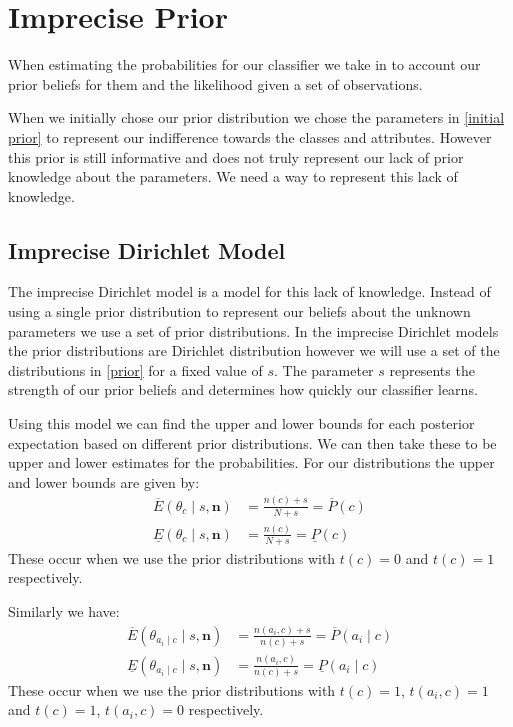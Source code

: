 \newcommand{\sn}[2]{\ensuremath{{#1}\times 10^{#2}}}

\chapter{Imprecise Prior}

When estimating the probabilities for our classifier we take in to account our prior beliefs for them and the likelihood given a set of observations.

When we initially chose our prior distribution we chose the parameters in \cref{initial prior} to represent our indifference towards the classes and attributes.
However this prior is still informative and does not truly represent our lack of prior knowledge about the parameters.
We need a way to represent this lack of knowledge.

\section{Imprecise Dirichlet Model}

The imprecise Dirichlet model is a model for this lack of knowledge.
Instead of using a single prior distribution to represent our beliefs about the unknown parameters we use a set of prior distributions.
In the imprecise Dirichlet models the prior distributions are Dirichlet distribution however we will use a set of the distributions in \cref{prior} for a fixed value of $s$.
The parameter $s$ represents the strength of our prior beliefs and determines how quickly our classifier learns.

Using this model we can find the upper and lower bounds for each posterior expectation based on different prior distributions.
We can then take these to be upper and lower estimates for the probabilities.
For our distributions the upper and lower bounds are given by:
\begin{align}
	\overline{E}(\theta_c \mid s, \mathbf{n}) & = \frac{n(c) + s}{N+s} = \overline{P}(c) \\
	\underline{E}(\theta_c \mid s, \mathbf{n}) & = \frac{n(c)}{N+s} = \underline{P}(c)
\end{align}
These occur when we use the prior distributions with $t(c) = 0$ and $t(c) = 1$ respectively.

Similarly we have:
\begin{align}
	\overline{E}(\theta_{a_i \mid c} \mid s, \mathbf{n}) & = \frac{n(a_i, c) + s}{n(c)+s} = \overline{P}(a_i \mid c) \\
	\underline{E}(\theta_{a_i \mid c} \mid s, \mathbf{n}) & = \frac{n(a_i, c)}{n(c)+s} = \underline{P}(a_i \mid c)
\end{align}
These occur when we use the prior distributions with $t(c) = 1$, $t(a_i, c)=1$ and $t(c) = 1$, $t(a_i, c)=0$ respectively.


